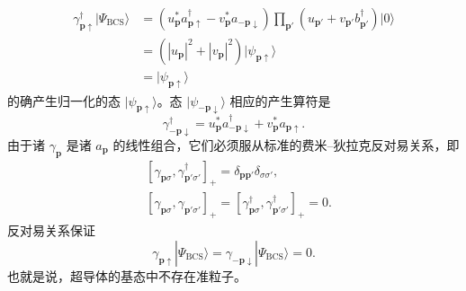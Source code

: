 \begin{align*}
\gamma_{\mathbf{p}\uparrow}^{\dagger}|\Psi_{\mathrm{BCS}}\rangle&=\left(u_{\mathbf{p}}^{*}a_{\mathbf{p}\uparrow}^{\dagger}-v_{\mathbf{p}}^{*}a_{-\mathbf{p}\downarrow}\right)\prod_{\mathbf{p}'}\left(u_{\mathbf{p}'}+v_{\mathbf{p}'}b_{\mathbf{p}'}^{\dagger}\right)|0\rangle\\
&=\left(|u_{\mathbf{p}}|^{2}+|v_{\mathbf{p}}|^{2}\right)|\psi_{\mathbf{p}\uparrow}\rangle\\
&=|\psi_{\mathbf{p}\uparrow}\rangle\tag{12.221}
\end{align*}
的确产生归一化的态 $|\psi_{\mathbf{p}\uparrow}\rangle$。态 $|\psi_{-\mathbf{p}\downarrow}\rangle$ 相应的产生算符是
\begin{equation*}
\gamma_{-\mathbf{p}\downarrow}^{\dagger}=u_{\mathbf{p}}^{*}a_{-\mathbf{p}\downarrow}^{\dagger}+v_{\mathbf{p}}^{*}a_{\mathbf{p}\uparrow}.\tag{12.222}
\end{equation*}
由于诸 $\gamma_{\mathbf{p}}$ 是诸 $a_{\mathbf{p}}$ 的线性组合，它们必须服从标准的费米–狄拉克反对易关系，即
\begin{align*}
&\left[\gamma_{\mathbf{p}\sigma},\gamma_{\mathbf{p}'\sigma'}^{\dagger}\right]_{+}=\delta_{\mathbf{p}\mathbf{p}'}\delta_{\sigma\sigma'},\\
&\left[\gamma_{\mathbf{p}\sigma},\gamma_{\mathbf{p}'\sigma'}\right]_{+}=\left[\gamma_{\mathbf{p}\sigma}^{\dagger},\gamma_{\mathbf{p}'\sigma'}^{\dagger}\right]_{+}=0.\tag{12.223}
\end{align*}
反对易关系保证
\begin{equation*}
\gamma_{\mathbf{p}\uparrow}|\Psi_{\mathrm{BCS}}\rangle=\gamma_{-\mathbf{p}\downarrow}|\Psi_{\mathrm{BCS}}\rangle=0.\tag{12.224}
\end{equation*}
也就是说，超导体的基态中不存在准粒子。

